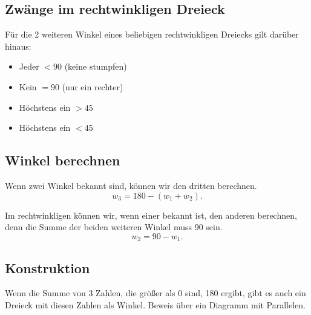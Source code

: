\documentclass[a4paper]{amsart}
\theoremstyle{definition}
\begin{document}
\subsection{Zwänge im rechtwinkligen Dreieck}
Für die 2 weiteren Winkel eines beliebigen rechtwinkligen Dreiecks gilt darüber hinaus:
\begin{itemize}
   \item Jeder $< 90$ (keine stumpfen)
   \item Kein $= 90$ (nur ein rechter)
   \item Höchstens ein $> 45$
   \item Höchstens ein $< 45$ 
\end{itemize}

\subsection{Winkel berechnen}
Wenn zwei Winkel bekannt sind, können wir den dritten berechnen. 
\begin{equation}\label{berechnen}
   w_3 = 180 - (w_1+w_2).
\end{equation}

Im rechtwinkligen können wir, wenn einer bekannt ist, den anderen berechnen, denn die Summe der beiden weiteren Winkel muss 90 sein.
\begin{equation}\label{berechnenRecht}
   w_2 = 90 - w_1.
\end{equation}

\subsection{Konstruktion}
Wenn die Summe von 3 Zahlen, die größer als 0 sind, 180 ergibt, gibt es auch ein Dreieck mit diesen Zahlen als Winkel. Beweis über ein Diagramm mit Parallelen. 

\end{document}
